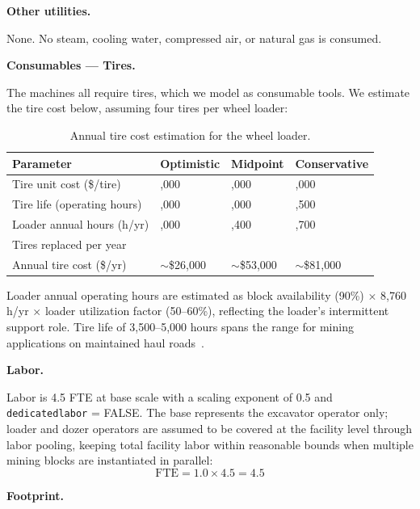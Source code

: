 \documentclass{article}
\renewcommand\_{\textunderscore\allowbreak}
\begin{document}
\medskip
\noindent\textbf{Other utilities.}\quad

None. No steam, cooling water, compressed air, or natural gas is consumed.

\medskip
\noindent\textbf{Consumables --- Tires.}\quad

The machines all require tires, which we model as consumable tools. We estimate the tire cost below, assuming four tires per wheel loader:

\begin{table}[h!]
\caption{Annual tire cost estimation for the wheel loader.}
\centering
\begin{tabular}{>{\raggedright\arraybackslash}p{4.7cm}
				>{\raggedright\arraybackslash}p{2.9cm}
				>{\raggedright\arraybackslash}p{2.7cm}
				>{\raggedright\arraybackslash}p{2.9cm}}
\toprule
\textbf{Parameter} & \textbf{Optimistic} & \textbf{Midpoint} & \textbf{Conservative} \\
\midrule
Tire unit cost (\$/tire) & 8,000 & 12,000 & 15,000 \\
Tire life (operating hours) & 5,000 & 4,000 & 3,500 \\
Loader annual hours (h/yr) & 4,000 & 4,400 & 4,700 \\
Tires replaced per year & 3.2 & 4.4 & 5.4 \\
Annual tire cost (\$/yr) & $\sim$\$26,000 & $\sim$\$53,000 & $\sim$\$81,000 \\
\bottomrule
\end{tabular}
\end{table}

\noindent Loader annual operating hours are estimated as block availability (90\%) $\times$ 8,760 h/yr $\times$ loader utilization factor (50--60\%), reflecting the loader's intermittent support role. Tire life of 3,500--5,000 hours spans the range for mining applications on maintained haul roads~\citep{CatPerformanceHandbookfromVSTfuelconsumption20221209T212009}.

\medskip
\noindent\textbf{Labor.}\quad

Labor is 4.5 FTE at base scale with a scaling exponent of 0.5 and \texttt{dedicated\_labor} = FALSE. The base represents the excavator operator only; loader and dozer operators are assumed to be covered at the facility level through labor pooling, keeping total facility labor within reasonable bounds when multiple mining blocks are instantiated in parallel:
\[
	\text{FTE} = 1.0 \times 4.5 = 4.5
\]

\medskip
\noindent\textbf{Footprint.}\quad
\end{document}
